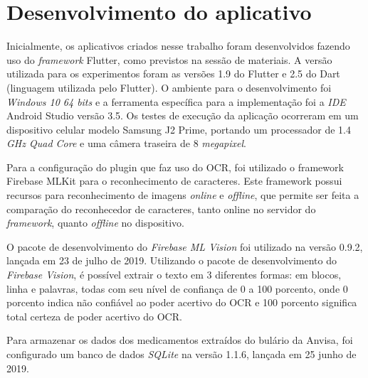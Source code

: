 \section{Desenvolvimento do aplicativo}
Inicialmente, os aplicativos criados nesse trabalho foram desenvolvidos fazendo uso do \textit{framework} Flutter, como previstos na sessão de materiais. A versão utilizada para os experimentos foram as versões 1.9 do Flutter e 2.5 do Dart (linguagem utilizada pelo Flutter). O ambiente para o desenvolvimento foi \textit{Windows 10 64 bits} e a ferramenta específica para a implementação foi a \textit{IDE} Android Studio versão 3.5.
Os testes de execução da aplicação ocorreram em um dispositivo celular  modelo Samsung J2 Prime, portando um processador de 1.4 \textit{GHz Quad Core} e uma câmera traseira de 8 \textit{megapixel}. 

Para a configuração do plugin que faz uso do OCR, foi utilizado o framework Firebase MLKit para o reconhecimento de caracteres. Este framework possui recursos para reconhecimento de imagens
\textit{online} e \textit{offline},
que permite ser feita a comparação do reconhecedor de caracteres, tanto online no servidor do \textit{framework}, quanto \textit{offline} no dispositivo.

O pacote de desenvolvimento do \textit{Firebase ML Vision} foi utilizado na versão 0.9.2, lançada em 23 de julho de 2019.	Utilizando o pacote de desenvolvimento do \textit{Firebase Vision}, é possível extrair o texto em 3 diferentes formas: em blocos, linha e palavras, todas com seu nível de confiança de 0 a 100 porcento, onde 0 porcento indica não confiável ao poder acertivo do OCR e 100 porcento significa total certeza de poder acertivo do OCR.
 
 Para armazenar os dados dos medicamentos extraídos do bulário da Anvisa, foi configurado um banco de dados \textit{SQLite} na versão 1.1.6, lançada em 25 junho de 2019. 




